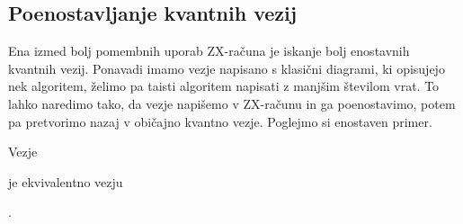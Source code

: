 \documentclass[mat1]{fmfdelo}
\begin{document}
\subsection{Poenostavljanje kvantnih vezij}
Ena izmed bolj pomembnih uporab ZX-računa je iskanje bolj enostavnih kvantnih vezij. Ponavadi imamo vezje napisano s klasični diagrami, ki opisujejo nek algoritem, želimo pa taisti algoritem napisati z manjšim številom vrat. To lahko naredimo tako, da vezje napišemo v ZX-računu in ga poenostavimo, potem pa pretvorimo nazaj v običajno kvantno vezje. Poglejmo si enostaven primer.
\begin{izrek}
    Vezje
    \begin{center}
    \end{center}
    je ekvivalentno vezju
    \begin{center}
    \end{center}.
\end{izrek}
\end{document}
